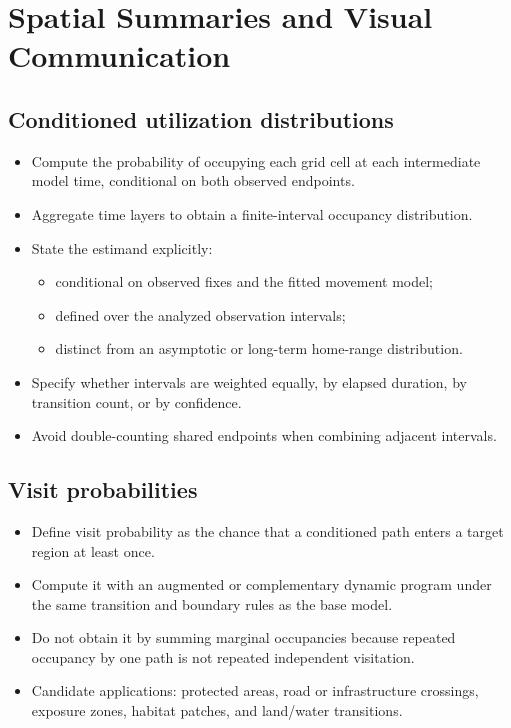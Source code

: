 \chapter{Spatial Summaries and Visual Communication}
\label{chap:spatial-summaries}

\section{Conditioned utilization distributions}

\begin{itemize}
  \item Compute the probability of occupying each grid cell at each intermediate model time, conditional on both observed endpoints.
  \item Aggregate time layers to obtain a finite-interval occupancy distribution.
  \item State the estimand explicitly:
  \begin{itemize}
    \item conditional on observed fixes and the fitted movement model;
    \item defined over the analyzed observation intervals;
    \item distinct from an asymptotic or long-term home-range distribution.
  \end{itemize}
  \item Specify whether intervals are weighted equally, by elapsed duration, by transition count, or by confidence.
  \item Avoid double-counting shared endpoints when combining adjacent intervals.
\end{itemize}

\section{Visit probabilities}

\begin{itemize}
  \item Define visit probability as the chance that a conditioned path enters a target region at least once.
  \item Compute it with an augmented or complementary dynamic program under the same transition and boundary rules as the base model.
  \item Do not obtain it by summing marginal occupancies because repeated occupancy by one path is not repeated independent visitation.
  \item Candidate applications: protected areas, road or infrastructure crossings, exposure zones, habitat patches, and land/water transitions.
\end{itemize}

